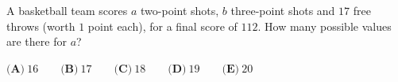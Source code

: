 A basketball team scores $a$ two-point shots, $b$ three-point shots and $17$ free throws (worth $1$ point each), for a final score of $112$. How many possible values are there for $a$?

$\textbf{(A)}\ 16\qquad\textbf{(B)}\ 17\qquad\textbf{(C)}\ 18\qquad\textbf{(D)}\ 19\qquad\textbf{(E)}\ 20$
